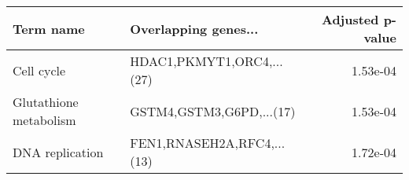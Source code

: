 \begin{tabular}{llr}
\toprule
             Term name &       Overlapping genes... &  Adjusted p-value \\
\midrule
            Cell cycle &  HDAC1,PKMYT1,ORC4,...(27) &          1.53e-04 \\
Glutathione metabolism &   GSTM4,GSTM3,G6PD,...(17) &          1.53e-04 \\
       DNA replication & FEN1,RNASEH2A,RFC4,...(13) &          1.72e-04 \\
\bottomrule
\end{tabular}
